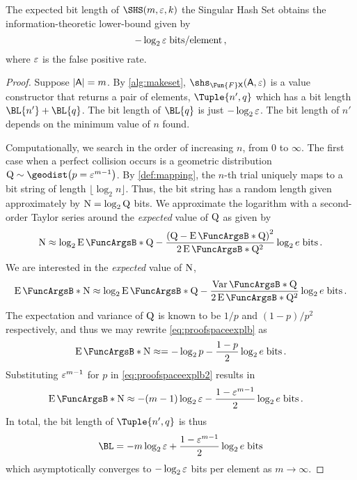\documentclass[ ../main.tex]{subfiles}
\begin{document}
\begin{theorem}
    The expected bit length of $\SHS(m,\fprate,k)$ the Singular Hash Set obtains the information-theoretic lower-bound given by
    \begin{equation}
        -\log_2 \fprate \; \si{bits \per element}\,,
    \end{equation}
    where $\fprate$ is the false positive rate.
\end{theorem}
\begin{proof}
    Suppose $\Card{\Set{A}}=m$.
    By \cref{alg:makeset}, $\shs_{\Fun{F} \Set{X}}(\Set{A},\fprate)$ is a value constructor that returns a pair of elements, $\Tuple{n',q}$ which has a bit length $\BL{n'} + \BL{q}$.
    The bit length of $\BL{q}$ is just $-\log_2 \fprate$.
    The bit length of $n'$ depends on the minimum value of $n$ found.
    
    Computationally, we search in the order of increasing $n$, from $0$ to $\infty$.
    The first case when a perfect collision occurs is a geometric distribution $\RV{Q} \sim \geodist \!\left(p = \fprate^{m-1}\right)$.
    By \cref{def:mapping}, the $n$-th trial uniquely maps to a bit string of length $\lfloor \log_2 n \rfloor$.
    Thus, the bit string has a random length given approximately by $\RV{N} = \log_2 \RV{Q}$ bits.
    We approximate the logarithm with a second-order Taylor series around the \emph{expected} value of $\RV{Q}$ as given by
    \begin{equation}
        \RV{N} \approx
        \log_2 \Expect{\RV{Q}} -
        \frac{\left(\RV{Q} - \Expect{\RV{Q}}\right)^2}{2 \Expect{\RV{Q}}^2}        
        \log_2 e\; \si{bits}\,.
    \end{equation}
    We are interested in the \emph{expected} value of $\RV{N}$,
    \begin{equation}
        \label{eq:proofspaceexplb}
        \Expect{\RV{N}} \approx
        \log_2 \Expect{\RV{Q}} -
        \frac{\Var{\RV{Q}}}{2 \Expect{\RV{Q}}^2} \log_2 e \; \si{bits}\,.
    \end{equation}
    The expectation and variance of $\RV{Q}$ is known to be $1/p$ and $(1-p)/p^2$ respectively, and thus we may rewrite \cref{eq:proofspaceexplb} as
    \begin{equation}
        \label{eq:proofspaceexplb2}
        \Expect{\RV{N}} \approx = -\log_2 p - \frac{1-p}{2} \log_2 e \; \si{bits}\,.
    \end{equation} 
    Substituting $\fprate^{m-1}$ for $p$ in \cref{eq:proofspaceexplb2} results in
    \begin{align}
        \Expect{\RV{N}}
        &\approx -(m-1) \log_2 \fprate - \frac{1-\fprate^{m-1}}{2} \log_2 e \; \si{bits}\,.
    \end{align}
    In total, the bit length of $\Tuple{n',q}$ is thus
    \begin{equation}
        \BL = -m \log_2 \fprate +  \frac{1-\fprate^{m-1}}{2} \log_2 e \; \si{bits}
    \end{equation}
    which asymptotically converges to $-\log_2 \fprate$ bits per element as $m \to \infty$.
\end{proof}
\end{document}
